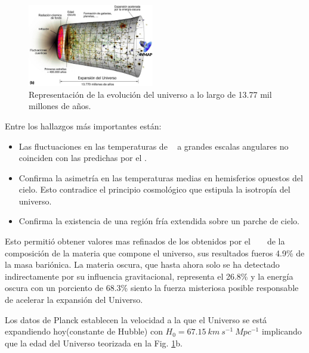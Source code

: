 \begin{figure}[!t]
    \centering
    \includegraphics[width=0.49\textwidth]{Fisica_de_Particulas/imagenes/Universo_evo0.jpg}
    \caption[Representación de la evolución del universo]{Representación de la evolución del universo a lo largo de 13.77 mil millones de a\~nos. \footnotemark
    }
    \label{universo}
\end{figure}

Entre los hallazgos más importantes están:
\begin{itemize}
\item Las fluctuaciones en las temperaturas de \CMB ~ a grandes escalas angulares no coinciden con las predichas por el \ME. %
\item Confirma la asimetría en las temperaturas medias en hemisferios opuestos del cielo. Esto contradice el principio cosmológico que estipula la isotropía del universo.
\item Confirma la existencia de una región fría extendida sobre un parche de cielo.
\end{itemize}

Esto permitió obtener valores mas refinados de los obtenidos por el ~ \WMAP ~ de la composición de la materia que compone el universo, sus resultados fueros 4.9\% de la masa bariónica. La materia oscura, que hasta ahora solo se ha detectado indirectamente por su influencia gravitacional, representa el 26.8\% y la energía oscura con un porciento de 68.3\% siento la fuerza misteriosa posible responsable de acelerar la expansión del Universo.

Los datos de Planck establecen la velocidad a la que el Universo se está expandiendo hoy(constante de Hubble) con $H_0 = 67.15~km~s^{-1} ~Mpc^{-1}$ implicando que la edad del Universo teorizada en la Fig. \ref{universo}b. 

